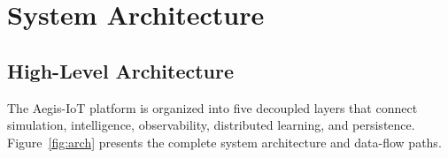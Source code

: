 \chapter{System Architecture}

\section{High-Level Architecture}

The Aegis-IoT platform is organized into five decoupled layers that connect simulation, intelligence, observability, distributed learning, and persistence. Figure~\ref{fig:arch} presents the complete system architecture and data-flow paths.


